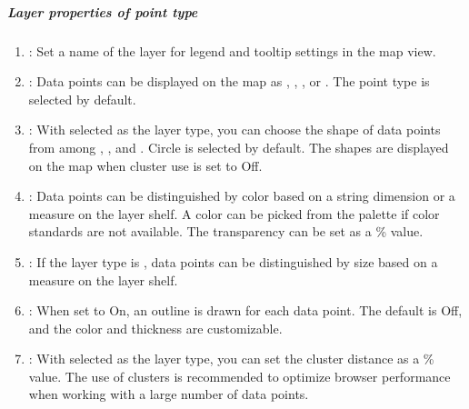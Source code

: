 \documentclass[letterpaper,10pt,english]{sphinxmanual}
\begin{document}
\subparagraph{Layer properties of point type}
\label{\detokenize{discovery/part04/map_chart:point}}\begin{quote}

\begin{figure}[H]
\centering

\noindent{}
\end{figure}
\end{quote}
\begin{enumerate}
\def\theenumi{\arabic{enumi}}
\def\labelenumi{\theenumi .}
\makeatletter\def\p@enumii{\p@enumi \theenumi .}\makeatother
\item {} 
: Set a name of the layer for legend and tooltip settings in the map view.

\item {} 
: Data points can be displayed on the map as , , , or . The point type is selected by default.

\item {} 
: With  selected as the layer type, you can choose the shape of data points from among , , and . Circle is selected by default. The shapes are displayed on the map when cluster use is set to Off.

\item {} 
: Data points can be distinguished by color based on a string dimension or a measure on the layer shelf. A color can be picked from the palette if color standards are not available. The transparency can be set as a \% value.

\item {} 
: If the layer type is , data points can be distinguished by size based on a measure on the layer shelf.

\item {} 
: When set to On, an outline is drawn for each data point. The default is Off, and the color and thickness are customizable.

\item {} 
: With  selected as the layer type, you can set the cluster distance as a \% value. The use of clusters is recommended to optimize browser performance when working with a large number of data points.


\end{enumerate}
\end{document}
